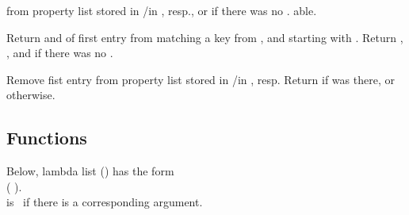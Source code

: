 \begin{LIST}{1cm}
  \label{:property_lists}
  {
   from property list stored in
  /in , resp., or  if
  there was no . able.
  }

  {
  Return  and  of first entry from 
  matching a key from , and  starting with . Return \retval{\NIL},
  \retvalii{\NIL}, and  \retvaliii{\NIL} if there was no .
  }

  {
  Remove fist entry  from property list stored in
  /in , resp. Return \retval{\T} if 
  was there, or \retval{\NIL} otherwise.
  }

\end{LIST}


\subsection{Functions}
\label{section:Functions}


Below, lambda list () has the form\\
(
).\\
 is \T\ if there is a corresponding argument.


